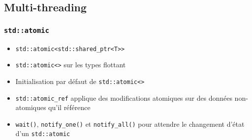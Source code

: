 \documentclass[C++.tex]{subfiles}
\begin{document}
\subsection*{Multi-threading}
\begin{frame}[fragile]
	\frametitle{\lstinline|std::atomic|}
	\begin{itemize}
		\item \lstinline|std::atomic<std::shared_ptr<T>>|
		\item \lstinline|std::atomic<>| sur les types flottant
		\item Initialisation par défaut de \lstinline|std::atomic<>|
		\item \lstinline|std::atomic_ref| applique des modifications atomiques sur des données non-atomiques qu'il référence
		\item \lstinline|wait()|, \lstinline|notify_one()| et \lstinline|notify_all()| pour attendre le changement d'état d'un \lstinline|std::atomic|
	\end{itemize}
\end{frame}
\end{document}
